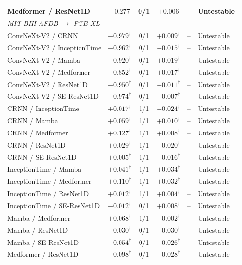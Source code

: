 \begin{table}[ht]
\begin{tabular}{lccccl}
Medformer / ResNet1D & $-0.277$ & 0/1 & $+0.006$ & -- & Untestable \\
\midrule
\multicolumn{6}{l}{\textit{MIT-BIH AFDB $\rightarrow$ PTB-XL}} \\
ConvNeXt-V2 / CRNN & $-0.979^{\dagger}$ & 0/1 & $+0.009^{\dagger}$ & -- & Untestable \\
ConvNeXt-V2 / InceptionTime & $-0.962^{\dagger}$ & 0/1 & $-0.015^{\dagger}$ & -- & Untestable \\
ConvNeXt-V2 / Mamba & $-0.920^{\dagger}$ & 0/1 & $+0.019^{\dagger}$ & -- & Untestable \\
ConvNeXt-V2 / Medformer & $-0.852^{\dagger}$ & 0/1 & $+0.017^{\dagger}$ & -- & Untestable \\
ConvNeXt-V2 / ResNet1D & $-0.950^{\dagger}$ & 0/1 & $-0.011^{\dagger}$ & -- & Untestable \\
ConvNeXt-V2 / SE-ResNet1D & $-0.974^{\dagger}$ & 0/1 & $-0.007^{\dagger}$ & -- & Untestable \\
CRNN / InceptionTime & $+0.017^{\dagger}$ & 1/1 & $-0.024^{\dagger}$ & -- & Untestable \\
CRNN / Mamba & $+0.059^{\dagger}$ & 1/1 & $+0.010^{\dagger}$ & -- & Untestable \\
CRNN / Medformer & $+0.127^{\dagger}$ & 1/1 & $+0.008^{\dagger}$ & -- & Untestable \\
CRNN / ResNet1D & $+0.029^{\dagger}$ & 1/1 & $-0.020^{\dagger}$ & -- & Untestable \\
CRNN / SE-ResNet1D & $+0.005^{\dagger}$ & 1/1 & $-0.016^{\dagger}$ & -- & Untestable \\
InceptionTime / Mamba & $+0.041^{\dagger}$ & 1/1 & $+0.034^{\dagger}$ & -- & Untestable \\
InceptionTime / Medformer & $+0.110^{\dagger}$ & 1/1 & $+0.032^{\dagger}$ & -- & Untestable \\
InceptionTime / ResNet1D & $+0.012^{\dagger}$ & 1/1 & $+0.004^{\dagger}$ & -- & Untestable \\
InceptionTime / SE-ResNet1D & $-0.012^{\dagger}$ & 0/1 & $+0.008^{\dagger}$ & -- & Untestable \\
Mamba / Medformer & $+0.068^{\dagger}$ & 1/1 & $-0.002^{\dagger}$ & -- & Untestable \\
Mamba / ResNet1D & $-0.030^{\dagger}$ & 0/1 & $-0.030^{\dagger}$ & -- & Untestable \\
Mamba / SE-ResNet1D & $-0.054^{\dagger}$ & 0/1 & $-0.026^{\dagger}$ & -- & Untestable \\
Medformer / ResNet1D & $-0.098^{\dagger}$ & 0/1 & $-0.028^{\dagger}$ & -- & Untestable \\

\end{tabular}
\end{table}
